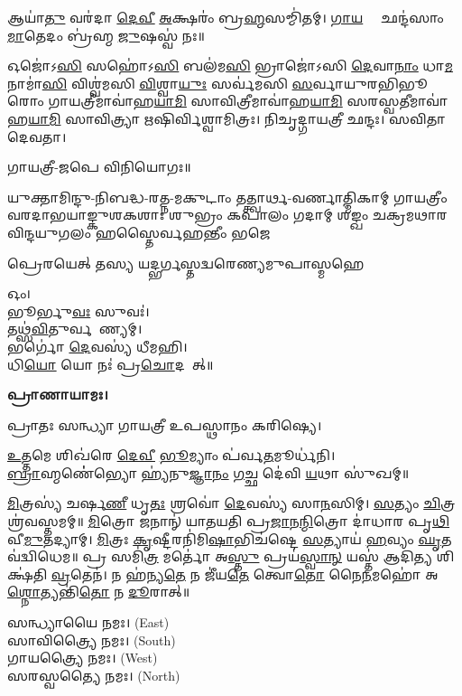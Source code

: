 𑌆𑌯𑌾॑\ul{𑌤𑍁} 𑌵𑌰॑𑌦𑌾 \ul{𑌦𑍇}\ul{𑌵𑍀} \ul{𑌅}𑌕𑍍𑌷𑌰𑌂॑ 𑌬𑍍𑌰\ul{𑌹𑍍𑌮}𑌸𑌮𑍍𑌮𑌿॑𑌤𑌮𑍍। \ul{𑌗𑌾}\ul{𑌯}𑌤𑍍𑌰𑍀𑌂᳚ 𑌛𑌨𑍍𑌦॑𑌸𑌾𑌂 \ul{𑌮𑌾}𑌤𑍇𑌦𑌂 𑌬𑍍𑌰॑𑌹𑍍𑌮 \ul{𑌜𑍁}𑌷𑌸𑍍𑌵॑ 𑌨𑌃॥

𑌓𑌜𑍋॑𑌽\ul{𑌸𑌿} 𑌸𑌹𑍋॑𑌽\ul{𑌸𑌿} 𑌬𑌲॑𑌮\ul{𑌸𑌿} 𑌭𑍍𑌰𑌾𑌜𑍋॑𑌽𑌸𑌿 \ul{𑌦𑍇}𑌵𑌾\ul{𑌨𑌾𑌂} 𑌧𑌾\ul{𑌮} 𑌨𑌾𑌮𑌾॑\ul{𑌸𑌿} 𑌵𑌿𑌶𑍍𑌵॑𑌮𑌸𑌿 \ul{𑌵𑌿}𑌶𑍍𑌵𑌾\ul{𑌯𑍁𑌃} 𑌸𑌰𑍍𑌵॑𑌮𑌸𑌿 \ul{𑌸}𑌰𑍍𑌵𑌾𑌯𑍁𑌰𑌭𑌿𑌭𑍂𑌰𑍋𑌂 𑌗𑌾𑌯𑌤𑍍𑌰𑍀𑌮𑌾𑌵𑌾॑𑌹\ul{𑌯𑌾}\ul{𑌮𑌿} 𑌸𑌾𑌵𑌿𑌤𑍍𑌰𑍀𑌮𑌾𑌵𑌾॑𑌹\ul{𑌯𑌾}\ul{𑌮𑌿} 𑌸𑌰𑌸𑍍𑌵𑌤𑍀𑌮𑌾𑌵𑌾॑𑌹\-\ul{𑌯𑌾}\ul{𑌮𑌿} 𑌸𑌾𑌵𑌿𑌤𑍍𑌰𑍍𑌯𑌾 𑌋𑌷𑌿𑌰𑍍𑌵𑌿𑌶𑍍𑌵𑌾𑌮𑌿𑌤𑍍𑌰𑌃। 𑌨𑌿𑌚𑍃𑌦𑍍𑌗𑌾𑌯𑌤𑍍𑌰𑍀 𑌛𑌨𑍍𑌦𑌃। 𑌸𑌵𑌿𑌤𑌾 𑌦𑍇𑌵𑌤𑌾।

𑌗𑌾𑌯𑌤𑍍𑌰𑍀-𑌜𑌪𑍇 𑌵𑌿𑌨𑌿𑌯𑍋𑌗𑌃॥



{𑌯𑍁𑌕𑍍𑌤𑌾𑌮𑌿𑌨𑍍𑌦𑍁-𑌨𑌿𑌬𑌦𑍍𑌧-𑌰𑌤𑍍𑌨-𑌮𑌕𑍁𑌟𑌾𑌂 𑌤𑌤𑍍𑌤𑍍𑌵𑌾𑌰𑍍𑌥-𑌵𑌰𑍍𑌣𑌾𑌤𑍍𑌮𑌿𑌕𑌾𑌮𑍍}
{𑌗𑌾𑌯𑌤𑍍𑌰𑍀𑌂 𑌵𑌰𑌦𑌾𑌭𑌯𑌾𑌙𑍍𑌕𑍁𑌶𑌕𑌶𑌾𑌃 𑌶𑍁𑌭𑍍𑌰𑌂 𑌕𑌪𑌾𑌲𑌂 𑌗𑌦𑌾𑌮𑍍}
{𑌶𑌙𑍍𑌖𑌂 𑌚𑌕𑍍𑌰𑌮𑌥𑌾𑌰𑌵𑌿𑌨𑍍𑌦𑌯𑍁𑌗𑌲𑌂 𑌹𑌸𑍍𑌤𑍈𑌰𑍍𑌵𑌹𑌨𑍍𑌤𑍀𑌂 𑌭𑌜𑍇}

{𑌪𑍍𑌰𑍇𑌰𑌯𑍇𑌤𑍍 𑌤𑌸𑍍𑌯 𑌯𑌦𑍍𑌭𑌰𑍍𑌗𑌸𑍍𑌤𑌦𑍍𑌵𑌰𑍇𑌣𑍍𑌯𑌮𑍁𑌪𑌾𑌸𑍍𑌮𑌹𑍇}


𑌓𑌂।\\
𑌭𑍂𑌰𑍍𑌭𑍁\ul{𑌵𑌃} 𑌸𑍁𑌵𑌃॑।\\
𑌤𑌥𑍍𑌸॑\ul{𑌵𑌿}𑌤𑍁𑌰𑍍𑌵𑌰𑍇᳚𑌣𑍍𑌯𑌮𑍍।\\
𑌭𑌰𑍍𑌗𑍋॑ \ul{𑌦𑍇}𑌵𑌸𑍍𑌯॑ 𑌧𑍀𑌮𑌹𑌿।\\
𑌧𑌿\ul{𑌯𑍋} 𑌯𑍋 𑌨𑌃॑ 𑌪𑍍𑌰\ul{𑌚𑍋}𑌦𑌯𑌾᳚𑌤𑍍॥

\textbf{𑌪𑍍𑌰𑌾𑌣𑌾𑌯𑌾𑌮𑌃।}


𑌪𑍍𑌰𑌾𑌤𑌃 𑌸𑌨𑍍𑌧𑍍𑌯𑌾 𑌗𑌾𑌯𑌤𑍍𑌰𑍀 𑌉𑌪𑌸𑍍𑌥𑌾𑌨𑌂 𑌕𑌰𑌿𑌷𑍍𑌯𑍇।

\ul{𑌉}𑌤𑍍𑌤𑌮𑍇 𑌶𑌿𑌖॑𑌰𑍇 \ul{𑌦𑍇}\ul{𑌵𑍀} \ul{𑌭𑍂}𑌮𑍍𑌯𑌾𑌂 𑌪॑𑌰𑍍𑌵\ul{𑌤}𑌮𑍂𑌰𑍍𑌧॑𑌨𑌿।\\
\ul{𑌬𑍍𑌰𑌾}𑌹𑍍𑌮𑌣𑍇॑॑𑌭𑍍𑌯𑍋 𑌹𑍍𑌯॑𑌨𑍁\ul{𑌜𑍍𑌞𑌾}\ul{𑌨𑌂} \ul{𑌗}𑌚𑍍𑌛 𑌦𑍇॑𑌵𑌿 \ul{𑌯}𑌥𑌾 𑌸𑍁॑𑌖𑌮𑍍॥


\ul{𑌮𑌿}𑌤𑍍𑌰𑌸𑍍𑌯॑ 𑌚𑌰𑍍\mbox{}𑌷\ul{𑌣𑍀} 𑌧𑍃\ul{𑌤𑌃} 𑌶𑍍𑌰𑌵𑍋॑ \ul{𑌦𑍇}𑌵𑌸𑍍𑌯॑ 𑌸𑌾\ul{𑌨}𑌸𑌿𑌮𑍍। \ul{𑌸}𑌤𑍍𑌯𑌂 \ul{𑌚𑌿}𑌤𑍍𑌰𑌶𑍍𑌰॑𑌵𑌸𑍍𑌤𑌮𑌮𑍍॥ \ul{𑌮𑌿}𑌤𑍍𑌰𑍋 𑌜𑌨𑌾𑌨𑍍॑ 𑌯𑌾𑌤𑌯𑌤𑌿 𑌪𑍍𑌰\ul{𑌜𑌾}𑌨\ul{𑌨𑍍𑌮𑌿}𑌤𑍍𑌰𑍋 𑌦𑌾॑𑌧𑌾𑌰 𑌪𑍃\ul{𑌥𑌿}𑌵𑍀\ul{𑌮𑍁}𑌤𑌦𑍍𑌯𑌾𑌮𑍍। \ul{𑌮𑌿}𑌤𑍍𑌰𑌃 \ul{𑌕𑍃}𑌷𑍍𑌟𑍀𑌰𑌨𑌿॑𑌮𑌿\ul{𑌷𑌾}𑌭𑌿𑌚॑𑌷𑍍𑌟𑍇 \ul{𑌸}𑌤𑍍𑌯𑌾𑌯॑ \ul{𑌹}𑌵𑍍𑌯𑌂 \ul{𑌘𑍃}𑌤𑌵॑𑌦𑍍𑌵𑌿𑌧𑍇𑌮॥ 𑌪𑍍𑌰 𑌸𑌮𑌿॑\ul{𑌤𑍍𑌰} 𑌮𑌰𑍍𑌤𑍋॑ 𑌅\ul{𑌸𑍍𑌤𑍁} 𑌪𑍍𑌰𑌯॑\ul{𑌸𑍍𑌵𑌾}\ul{𑌨𑍍} 𑌯𑌸𑍍𑌤॑ 𑌆𑌦𑌿\ul{𑌤𑍍𑌯} 𑌶𑌿𑌕𑍍𑌷॑𑌤𑌿 \ul{𑌵𑍍𑌰}𑌤𑍇𑌨॑। 𑌨 𑌹॑𑌨𑍍𑌯\ul{𑌤𑍇} 𑌨 𑌜𑍀॑𑌯\ul{𑌤𑍇} 𑌤𑍍𑌵𑍋\ul{𑌤𑍋} 𑌨𑍈\ul{𑌨}𑌮𑌹𑍋॑ 𑌅\ul{𑌶𑍍𑌨𑍋}𑌤𑍍𑌯𑌨𑍍𑌤𑌿॑\ul{𑌤𑍋} 𑌨 \ul{𑌦𑍂}𑌰𑌾𑌤𑍍॥



𑌸𑌨𑍍𑌧𑍍𑌯𑌾𑌯𑍈 𑌨𑌮𑌃।  {\scriptsize (East)}\\
𑌸𑌾𑌵𑌿𑌤𑍍𑌰𑍍𑌯𑍈 𑌨𑌮𑌃। {\scriptsize (South)}\\
𑌗𑌾𑌯𑌤𑍍𑌰𑍍𑌯𑍈 𑌨𑌮𑌃।  {\scriptsize (West)}\\
𑌸𑌰𑌸𑍍𑌵𑌤𑍍𑌯𑍈 𑌨𑌮𑌃।  {\scriptsize (North)}

